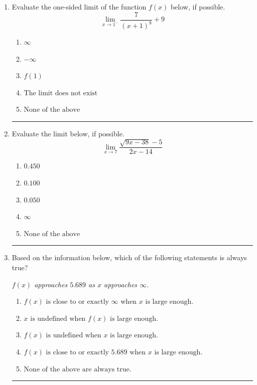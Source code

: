 \documentclass[14pt]{extbook}
\newcommand{\litem}[1]{\item#1\hspace*{-1cm}\rule{\textwidth}{0.4pt}}
\begin{document}
\begin{enumerate}
\litem{
Evaluate the one-sided limit of the function $f(x)$ below, if possible.\[ \lim_{x \rightarrow 1^-} \frac{7}{(x+1)^8}+9 \]\begin{enumerate}[label=\Alph*.]
\item \( \infty \)
\item \( -\infty \)
\item \( f(1) \)
\item \( \text{The limit does not exist} \)
\item \( \text{None of the above} \)

\end{enumerate} }
\litem{
Evaluate the limit below, if possible.\[ \lim_{x \rightarrow 7} \frac{\sqrt{9x - 38} - 5}{2x - 14} \]\begin{enumerate}[label=\Alph*.]
\item \( 0.450 \)
\item \( 0.100 \)
\item \( 0.050 \)
\item \( \infty \)
\item \( \text{None of the above} \)

\end{enumerate} }
\litem{
Based on the information below, which of the following statements is always true?
\begin{center}
    \textit{ $f(x)$ approaches $5.689$ as $x$ approaches $\infty$. }
\end{center}
\begin{enumerate}[label=\Alph*.]
\item \( f(x) \text{ is close to or exactly } \infty \text{ when } x \text{ is large enough}. \)
\item \( x \text{ is undefined when } f(x) \text{ is large enough}. \)
\item \( f(x) \text{ is undefined when } x \text{ is large enough}. \)
\item \( f(x) \text{ is close to or exactly } 5.689 \text{ when } x \text{ is large enough}. \)
\item \( \text{None of the above are always true.} \)


\end{enumerate}}
\end{enumerate}
\end{document}
